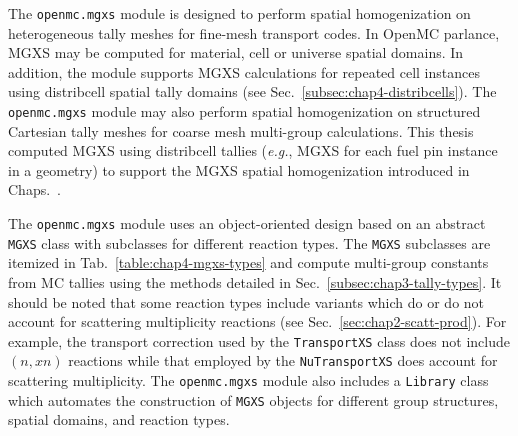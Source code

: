 The \texttt{openmc.mgxs} module is designed to perform spatial homogenization on heterogeneous tally meshes for fine-mesh transport codes. In OpenMC parlance, \ac{MGXS} may be computed for material, cell or universe spatial domains. In addition, the module supports \ac{MGXS} calculations for repeated cell instances using distribcell spatial tally domains (see Sec.~\ref{subsec:chap4-distribcells}). The \texttt{openmc.mgxs} module may also perform spatial homogenization on structured Cartesian tally meshes for coarse mesh multi-group calculations. This thesis computed \ac{MGXS} using distribcell tallies (\textit{e.g.}, \ac{MGXS} for each fuel pin instance in a geometry) to support the \ac{MGXS} spatial homogenization introduced in Chaps.~.

The \texttt{openmc.mgxs} module uses an object-oriented design based on an abstract \texttt{MGXS} class with subclasses for different reaction types. The \texttt{MGXS} subclasses are itemized in Tab.~\ref{table:chap4-mgxs-types} and compute multi-group constants from \ac{MC} tallies using the methods detailed in Sec.~\ref{subsec:chap3-tally-types}. It should be noted that some reaction types include variants which do or do not account for scattering multiplicity reactions (see Sec.~\ref{sec:chap2-scatt-prod}). For example, the transport correction used by the \texttt{TransportXS} class does not include $(n,xn)$ reactions while that employed by the \texttt{NuTransportXS} does account for scattering multiplicity. The \texttt{openmc.mgxs} module also includes a \texttt{Library} class which automates the construction of \texttt{MGXS} objects for different group structures, spatial domains, and reaction types.

